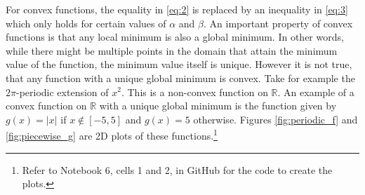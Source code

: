For convex functions, the equality in \eqref{eq:2} is replaced by an inequality in \eqref{eq:3} which only holds for certain values of $\alpha$ and $\beta$. An important property of convex functions is that any local minimum is also a global minimum. In other words, while there might be multiple points in the domain that attain the minimum value of the function, the minimum value itself is unique. However it is not true, that any function with a unique global minimum is convex. Take for example the $2\pi$-periodic extension of $x^{2}.$ This is a non-convex function on $\mathbb{R}$. 
\newpage
An example of a convex function on $\mathbb{R}$ with a unique global minimum is the function given by $g(x) = |x|$ if $x\notin [-5, 5]$ and $g(x)=5$ otherwise. Figures \ref{fig:periodic_f} and \ref{fig:piecewise_g} are 2D plots of these functions.\footnote{Refer to Notebook 6, cells 1 and 2, in GitHub \cite{ThesisCode2023} for the code to create the plots.}

